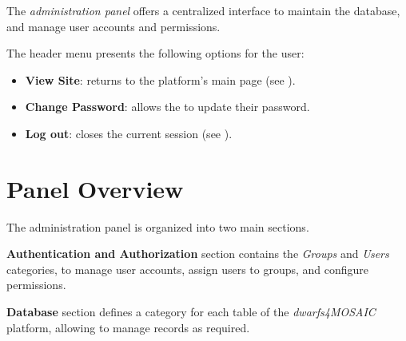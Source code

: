 

The \textsl{administration panel} offers a centralized interface to maintain the database, and manage user accounts and permissions. 

The header menu presents the following options for the \admin user:

\begin{itemize}
	\item \textbf{View Site}: returns to the platform’s main page (see ).
	\item \textbf{Change Password}: allows the \admin to update their password.
	\item \textbf{Log out}: closes the current session (see ).
\end{itemize}



\section{Panel Overview} \label{sec:admin-panel-overview}

The administration panel is organized into two main sections.

\textbf{Authentication and Authorization} section contains the \textsl{Groups} and \textsl{Users} categories, to manage user accounts, assign users to groups, and configure permissions.
	

\textbf{Database} section defines a category for each table of the \textsl{dwarfs4MOSAIC} platform, allowing to manage records as required.
	
	

